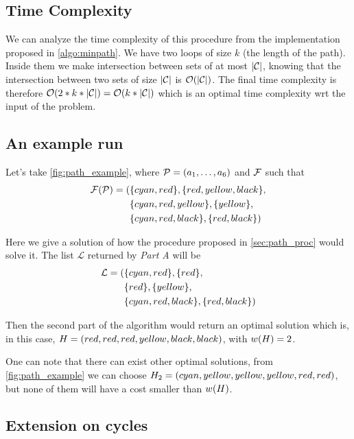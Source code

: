 \subsection{Time Complexity}

We can analyze the time complexity of this procedure from the implementation proposed in \cref{algo:minpath}. We have two loops of size $k$ (the length of the path). Inside them we make intersection between sets of at most $| \mathcal{C} |$, knowing that the intersection between two sets of size $| \mathcal{C} |$ is $\mathcal{O}(| \mathcal{C} |)$. The final time complexity is therefore $\mathcal{O}(2 * k * | \mathcal{C} |) = \mathcal{O}(k * | \mathcal{C} |)$ which is an optimal time complexity wrt the input of the problem.

\subsection{An example run}
\label{sec:path_ex_run}



Let's take \cref{fig:path_example}, where $\mathcal{P} = (a_1,\ldots,a_{6})$ and $\mathcal{F}$ such that
\begin{align*}
	\mathcal{F}(\mathcal{P}) = ( & \{cyan,red\}, \{red,yellow,black\},    \\
	                 & \{cyan,red,yellow\}, \{yellow\},    \\
	                 & \{cyan,red,black\}, \{red,black\}   )
\end{align*}

Here we give a solution of how the procedure proposed in \cref{sec:path_proc} would solve it. The list $\mathcal{L}$ returned by \textit{Part A} will be
\begin{align*}
	\mathcal{L} = ( & \{cyan,red\}, \{red\},      \\
	                & \{red\}, \{yellow\},        \\
	                & \{cyan,red,black\}, \{red,black\}   )
\end{align*}

Then the second part of the algorithm would return an optimal solution which is, in this case, $H = (red, red, red, yellow, black, black)$, with $w(H) = 2$.

One can note that there can exist other optimal solutions, from \cref{fig:path_example} we can choose $H_2 = (cyan, yellow, yellow, yellow, red, red)$, but none of them will have a cost smaller than $w(H)$.

\subsection{Extension on cycles}

